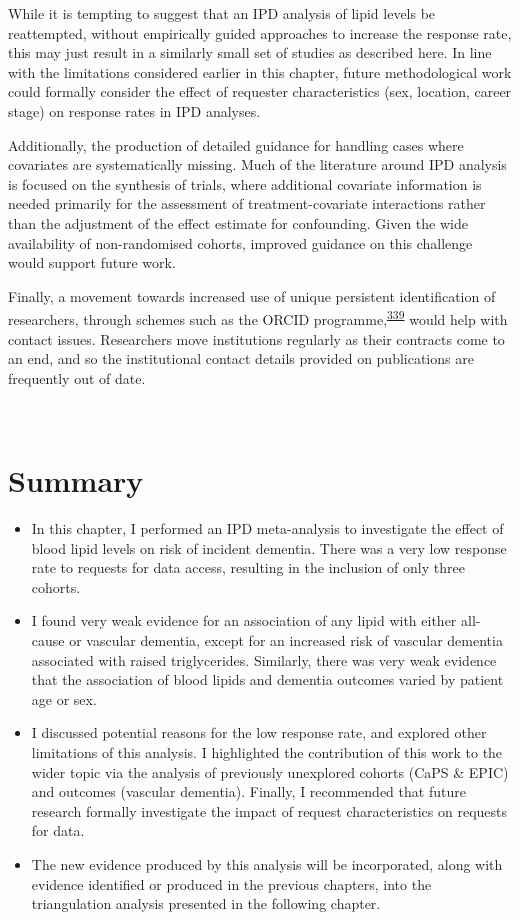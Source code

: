 \documentclass[a4paper, twoside]{templates/ociamthesis}
\begin{document}
While it is tempting to suggest that an IPD analysis of lipid levels be reattempted, without empirically guided approaches to increase the response rate, this may just result in a similarly small set of studies as described here. In line with the limitations considered earlier in this chapter, future methodological work could formally consider the effect of requester characteristics (sex, location, career stage) on response rates in IPD analyses.

Additionally, the production of detailed guidance for handling cases where covariates are systematically missing. Much of the literature around IPD analysis is focused on the synthesis of trials, where additional covariate information is needed primarily for the assessment of treatment-covariate interactions rather than the adjustment of the effect estimate for confounding. Given the wide availability of non-randomised cohorts, improved guidance on this challenge would support future work.

Finally, a movement towards increased use of unique persistent identification of researchers, through schemes such as the ORCID programme,\textsuperscript{\protect\hyperlink{ref-nature2009}{339}} would help with contact issues. Researchers move institutions regularly as their contracts come to an end, and so the institutional contact details provided on publications are frequently out of date.

~

\hypertarget{summary-5}{%
\section{Summary}\label{summary-5}}

\begin{itemize}
\item
  In this chapter, I performed an IPD meta-analysis to investigate the effect of blood lipid levels on risk of incident dementia. There was a very low response rate to requests for data access, resulting in the inclusion of only three cohorts.
\item
  I found very weak evidence for an association of any lipid with either all-cause or vascular dementia, except for an increased risk of vascular dementia associated with raised triglycerides. Similarly, there was very weak evidence that the association of blood lipids and dementia outcomes varied by patient age or sex.
\item
  I discussed potential reasons for the low response rate, and explored other limitations of this analysis. I highlighted the contribution of this work to the wider topic via the analysis of previously unexplored cohorts (CaPS \& EPIC) and outcomes (vascular dementia). Finally, I recommended that future research formally investigate the impact of request characteristics on requests for data.
\item
  The new evidence produced by this analysis will be incorporated, along with evidence identified or produced in the previous chapters, into the triangulation analysis presented in the following chapter.
\end{itemize}
\end{document}
